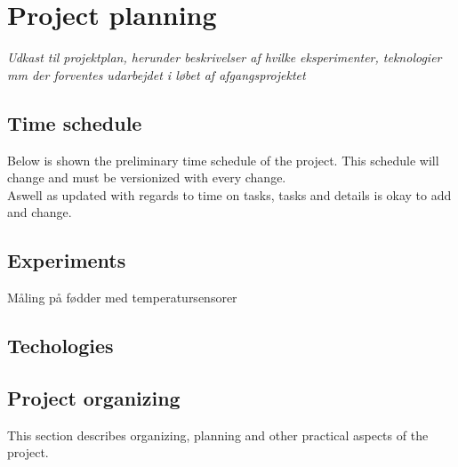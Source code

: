 \chapter{Project planning}
\textit{Udkast til projektplan, herunder beskrivelser af hvilke eksperimenter, teknologier mm der forventes udarbejdet i løbet af afgangsprojektet}\\

\section{Time schedule}
Below is shown the preliminary time schedule of the project. This schedule will change and must be versionized with every change.\\
Aswell as updated with regards to time on tasks, tasks and details is okay to add and change.\\ 

\section{Experiments}
Måling på fødder med temperatursensorer

\section{Techologies}


\section{Project organizing}
This section describes organizing, planning and other practical aspects of the project.

